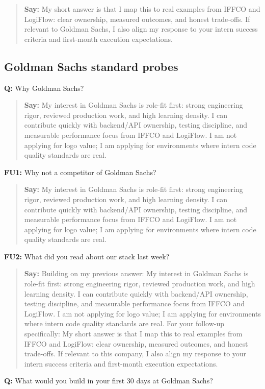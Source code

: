 \documentclass[9pt,a4paper]{article}
\begin{document}
\begin{quote}\small\textbf{Say:} My short answer is that I map this to real examples from IFFCO and LogiFlow: clear ownership, measured outcomes, and honest trade-offs. If relevant to Goldman Sachs, I also align my response to your intern success criteria and first-month execution expectations.\end{quote}
\vspace{2mm}
\subsection{Goldman Sachs standard probes}
\textbf{Q:} Why Goldman Sachs?

\begin{quote}\small\textbf{Say:} My interest in Goldman Sachs is role-fit first: strong engineering rigor, reviewed production work, and high learning density. I can contribute quickly with backend/API ownership, testing discipline, and measurable performance focus from IFFCO and LogiFlow. I am not applying for logo value; I am applying for environments where intern code quality standards are real.\end{quote}
\vspace{2mm}
\textbf{FU1:} Why not a competitor of Goldman Sachs?

\begin{quote}\small\textbf{Say:} My interest in Goldman Sachs is role-fit first: strong engineering rigor, reviewed production work, and high learning density. I can contribute quickly with backend/API ownership, testing discipline, and measurable performance focus from IFFCO and LogiFlow. I am not applying for logo value; I am applying for environments where intern code quality standards are real.\end{quote}
\vspace{2mm}
\textbf{FU2:} What did you read about our stack last week?

\begin{quote}\small\textbf{Say:} Building on my previous answer: My interest in Goldman Sachs is role-fit first: strong engineering rigor, reviewed production work, and high learning density. I can contribute quickly with backend/API ownership, testing discipline, and measurable performance focus from IFFCO and LogiFlow. I am not applying for logo value; I am applying for environments where intern code quality standards are real. For your follow-up specifically: My short answer is that I map this to real examples from IFFCO and LogiFlow: clear ownership, measured outcomes, and honest trade-offs. If relevant to this company, I also align my response to your intern success criteria and first-month execution expectations.\end{quote}
\vspace{2mm}
\textbf{Q:} What would you build in your first 30 days at Goldman Sachs?
\end{document}

